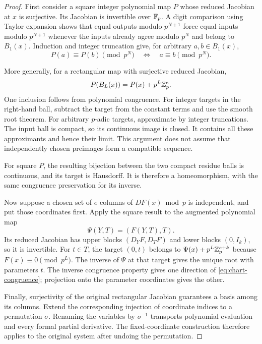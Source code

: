 \begin{proof}
First consider a square integer polynomial map $P$ whose reduced Jacobian
at $x$ is surjective. Its Jacobian is invertible over $\mathbb F_p$. A digit
comparison using Taylor expansion shows that equal outputs modulo
$p^{N+1}$ force equal inputs modulo $p^{N+1}$ whenever the inputs already
agree modulo $p^N$ and belong to $B_1(x)$. Induction and integer truncation
give, for arbitrary $a,b\in B_1(x)$,
\[
 P(a)\equiv P(b)\pmod{p^N}
 \quad\Longleftrightarrow\quad a\equiv b\pmod{p^N}.
\]

More generally, for a rectangular map with surjective reduced Jacobian,
\begin{equation}\label{eq:polynomial-ball-image}
 P(B_L(x))=P(x)+p^L\mathbb Z_p^e.
\end{equation}
One inclusion follows from polynomial congruence. For integer targets in
the right-hand ball, subtract the target from the constant terms and use
the smooth root theorem. For arbitrary $p$-adic targets, approximate by
integer truncations. The input ball is compact, so its continuous image is
closed. It contains all these approximants and hence their limit. This
argument does not assume that independently chosen preimages form a
compatible sequence.

For square $P$, the resulting bijection between the two compact residue
balls is continuous, and its target is Hausdorff. It is therefore a
homeomorphism, with the same congruence preservation for its inverse.

Now suppose a chosen set of $e$ columns of $DF(x)\bmod p$ is independent,
and put those coordinates first. Apply the square result to the augmented
polynomial map
\[
 \Psi(Y,T)=(F(Y,T),T).
\]
Its reduced Jacobian has upper blocks $(D_YF,D_TF)$ and lower blocks
$(0,I_k)$, so it is invertible. For $t\in T$, the target $(0,t)$ belongs
to $\Psi(x)+p^L\mathbb Z_p^{e+k}$ because $F(x)\equiv0\pmod{p^L}$.
The inverse of $\Psi$ at that target gives the unique root with parameters
$t$. The inverse congruence property gives one direction of
\eqref{eq:chart-congruence}; projection onto the parameter coordinates
gives the other.

Finally, surjectivity of the original rectangular Jacobian guarantees a
basis among its columns. Extend the corresponding injection of coordinate
indices to a permutation $\sigma$. Renaming the variables by
$\sigma^{-1}$ transports polynomial evaluation and every formal partial
derivative. The fixed-coordinate construction therefore applies to the
original system after undoing the permutation.
\end{proof}

